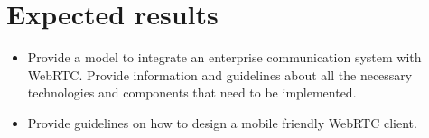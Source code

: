 \section{Expected results}

\begin{itemize}
		\item Provide a model to integrate an enterprise communication system with WebRTC. Provide information and guidelines about all the necessary technologies and components that need to be implemented.
		\item Provide guidelines on how to design a mobile friendly WebRTC client.
\end{itemize}
